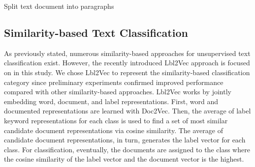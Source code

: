 \documentclass[sigconf]{acmart}
\begin{document}
\begin{algorithm}
    \caption{Split text document into paragraphs}
    \label{alg:split_docs}
    \begin{algorithmic}[0]
    \Require
        \State {}
        \State {}
                \State { + }
            \Else
                \State { + }
                \State {}
            \EndIf
        \EndFor
        \Return 
    \EndProcedure
    \end{algorithmic}
\end{algorithm}



\subsection{Similarity-based Text Classification}\label{sec:similarity-based-classsification}

As previously stated, numerous similarity-based approaches for unsupervised text classification exist. However, the recently introduced Lbl2Vec approach \cite{webist21} is focused on in this study. We chose Lbl2Vec to represent the similarity-based classification category since preliminary experiments confirmed improved performance compared with other similarity-based approaches. Lbl2Vec works by jointly embedding word, document, and label representations. First, word and documented representations are learned with Doc2Vec. Then, the average of label keyword representations for each class is used to find a set of most similar candidate document representations via cosine similarity. The average of candidate document representations, in turn, generates the label vector for each class. For classification, eventually, the documents are assigned to the class where the cosine similarity of the label vector and the document vector is the highest.
\end{document}
